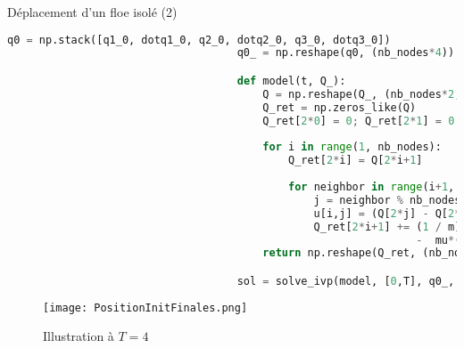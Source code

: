\begin{frame}[fragile]{Déplacement d'un floe isolé (2)}

    \tiny
    \begin{lstlisting}[language=Python,caption=Code de simulation et schéma avec Scipy]
                                    q0 = np.stack([q1_0, dotq1_0, q2_0, dotq2_0, q3_0, dotq3_0])
                                    q0_ = np.reshape(q0, (nb_nodes*4))

                                    def model(t, Q_):
                                        Q = np.reshape(Q_, (nb_nodes*2, 2))
                                        Q_ret = np.zeros_like(Q)
                                        Q_ret[2*0] = 0; Q_ret[2*1] = 0
                                        
                                        for i in range(1, nb_nodes):
                                            Q_ret[2*i] = Q[2*i+1] 
                                            
                                            for neighbor in range(i+1, i+3):
                                                j = neighbor % nb_nodes
                                                u[i,j] = (Q[2*j] - Q[2*i]) / nplin.norm(Q[2*j] - Q[2*i])
                                                Q_ret[2*i+1] += (1 / m)*C[i,j]*( k*(nplin.norm(Q[2*j]-Q[2*i]) - L[i,j])*u[i,j]
                                                                -  mu*(np.dot(Q[2*j+1] - Q[2*i+1], u[i,j]))*u[i,j] )
                                        return np.reshape(Q_ret, (nb_nodes*4))

                                    sol = solve_ivp(model, [0,T], q0_, t_eval=t)
    \end{lstlisting}

    \begin{figure}
        \centering
        \texttt{[image: PositionInitFinales.png]}
        \caption{Illustration à $T=4$}
    \end{figure}


\end{frame}